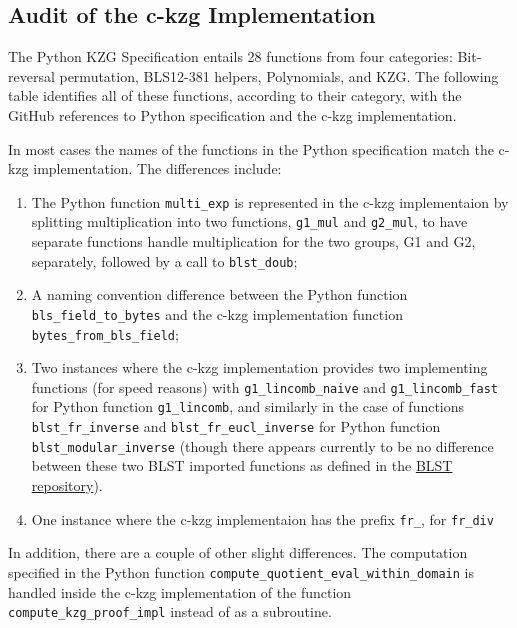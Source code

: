 \documentclass[12pt]{galois-whitepaper}
\begin{document}
\subsection{Audit of the c-kzg Implementation}

The Python KZG Specification entails 28 functions from four categories: 
Bit-reversal permutation, BLS12-381 helpers, Polynomials, and KZG. 
The following table identifies all of these functions, according to their category, 
with the GitHub references to Python specification and the c-kzg implementation. 

In most cases the names of the functions in the Python specification match the c-kzg implementation. 
The differences include:
\begin{enumerate}
    \item The Python function \texttt{multi\_exp} is represented in the c-kzg implementaion 
by splitting multiplication into two functions, \texttt{g1\_mul} and \texttt{g2\_mul}, to have separate functions 
handle multiplication for the two groups, G1 and G2, separately, followed by a call to \texttt{blst\_doub};
    \item A naming convention difference between the Python function \texttt{bls\_field\_to\_bytes} and the c-kzg 
implementation function \texttt{bytes\_from\_bls\_field};
    \item Two instances where the c-kzg implementation provides two implementing functions (for speed reasons) with 
\texttt{g1\_lincomb\_naive} and \texttt{g1\_lincomb\_fast} for Python function \texttt{g1\_lincomb}, and 
similarly in the case of functions \texttt{blst\_fr\_inverse} and \texttt{blst\_fr\_eucl\_inverse} for Python function 
\texttt{blst\_modular\_inverse} (though there appears currently to be no difference between these two BLST imported 
functions as defined in the 
\href{https://github.com/supranational/blst/blob/415d4f0e2347a794091836a3065206edfd9c72f3/src/recip.c#L135}{BLST repository}). 
    \item One instance where the c-kzg implementaion has the prefix \texttt{fr\_}, for \texttt{fr\_div}
\end{enumerate}

In addition, there are a couple of other slight differences. The computation specified in the Python function 
\texttt{compute\_quotient\_eval\_within\_domain} is handled inside the c-kzg implementation of the 
function \texttt{compute\_kzg\_proof\_impl} instead of as a subroutine.
\end{document}
